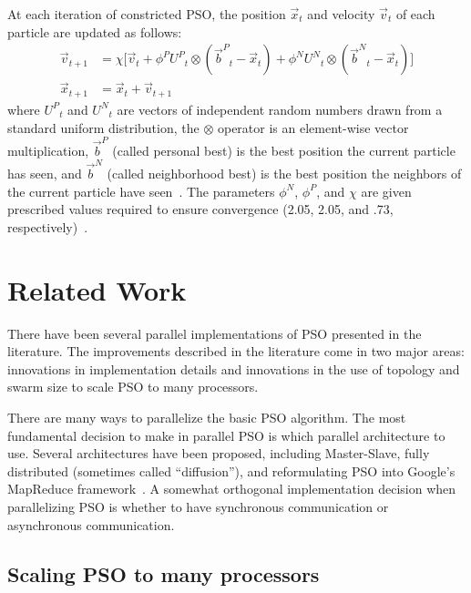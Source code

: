 \documentclass[ms]{byuprop}
\providecommand{\pers}{\ensuremath{P}}
\providecommand{\neigh}{\ensuremath{N}}
\providecommand{\nURand}{\ensuremath{U^\neigh}}
\providecommand{\pURand}{\ensuremath{U^\pers}}
\providecommand{\ppos}{\ensuremath{\Vec{x}}}
\providecommand{\pvel}{\ensuremath{\Vec{v}}}
\providecommand{\nbest}{\ensuremath{\Vec{b}^\neigh}}
\providecommand{\pbest}{\ensuremath{\Vec{b}^\pers}}
\providecommand{\constriction}{\ensuremath{\chi}}
\providecommand{\ncoeff}{\ensuremath{\phi^\neigh}}
\providecommand{\pcoeff}{\ensuremath{\phi^\pers}}
\begin{document}
At each iteration of constricted PSO, the position $\ppos_t$ and velocity
$\pvel_t$ of each particle are updated as follows:
\begin{align}
\label{eq:velupdate}
	\pvel_{t+1} &=
		\constriction \bigl[ \pvel_t
			+ \pcoeff\pURand_{t}\otimes(\pbest_{t} - \ppos_{t}) +
			\ncoeff\nURand_{t}\otimes(\nbest_{t} - \ppos_{t})
		\bigr] \\
\label{eq:posupdate}
	\ppos_{t+1} &= \ppos_{t} + \pvel_{t+1}
\end{align}
where \( \pURand_{t} \) and \( \nURand_{t} \) are vectors of independent random
numbers drawn from a standard uniform distribution, the \( \otimes \) operator
is an element-wise vector multiplication, $\pbest$ (called personal best) is
the best position the current particle has seen, and $\nbest$ (called
neighborhood best) is the best position the neighbors of the current particle
have seen~\citep{bratton-2007-defining-a-standard-for-pso}.  The parameters \(
\ncoeff \), \( \pcoeff \), and \( \constriction \) are given prescribed values
required to ensure convergence (2.05, 2.05, and .73,
respectively)~\citep{clerc-2002-constricted-pso}.


\section{Related Work}
\label{sec:related}

There have been several parallel implementations of PSO presented in the
literature.  The improvements described in the literature come in two major
areas: innovations in implementation details and innovations in the use of
topology and swarm size to scale PSO to many processors.

There are many ways to parallelize the basic PSO algorithm.  The most
fundamental decision to make in parallel PSO is which parallel architecture to
use.  Several architectures have been proposed, including Master-Slave, fully
distributed (sometimes called ``diffusion''), and reformulating PSO into
Google's MapReduce framework~\citep{belal-2004-parallel-models-for-pso,
mcnabb-2007-parallel-pso-using-mapreduce}.  A somewhat orthogonal
implementation decision when parallelizing PSO is whether to have synchronous
communication or asynchronous communication.

\subsection{Scaling PSO to many processors}
\end{document}
